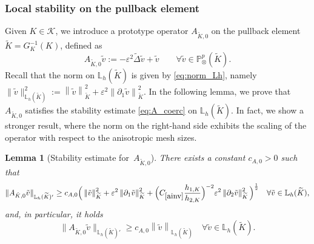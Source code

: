 \documentclass[a4paper,twoside,10pt]{article}
\newtheorem{lemma}[theorem]{Lemma}
\newcommand{\const}[1]{C_{\eqref{#1}}}
\newcommand{\AKO}{{A_{\tilde K,0}}}
\newcommand{\eps}{\varepsilon}
\newcommand*{\norm}[1]{\left\|#1\right\|}
\newcommand{\IL}{\mathbb{L}}
\newcommand{\IP}{\mathbb{P}}
\newcommand{\calK}{\mathcal{K}}
\numberwithin{equation}{section}
\newcommand{\Kt}{\widetilde{K}}
\newcommand{\hKot}{h_{1,K}}
\newcommand{\hKtt}{h_{2,K}}
\begin{document}
\subsubsection{Local stability on the pullback element}\label{sec:localstability_pullback}
Given $K\in\calK$, we introduce a prototype operator $\AKO$ on the pullback element $\Kt=G_K^{-1}(K)$, defined as
	\begin{equation}\label{eq:AK0}
	    \AKO  \tilde v := -\eps^2 
        \widetilde{\Delta}\tilde  v +   \tilde v \qquad 
        \forall \tilde v \in 
	    \IP^p_\otimes(\tilde K).
	\end{equation}
Recall that the norm on $\mathbb{L}_h(\Kt)$ is given by \eqref{eq:norm_Lh}, namely
$
\|\tilde v\|^2_{\mathbb{L}_h(\Kt)}
:= \norm{\tilde v}^2_{\Kt}
+\eps^2\norm{\partial_1\tilde v}^2_{\Kt}
$.
In the following lemma, we prove that $A_{\Kt,0}$ satisfies the stability estimate \eqref{eq:A_coerc} on $\IL_h(\Kt)$.
In fact, we show a stronger result, where the norm on the right-hand side exhibits the scaling of the operator with respect to the anisotropic mesh sizes.
	\begin{lemma}[Stability estimate for~$A_{\Kt, 0}$]\label{lem:localcoercivity}
		There exists a constant $c_{A,0}>0$ such that
	\begin{equation*}
		\|\AKO  \tilde v \|_{\IL_h(\Kt)'} 
	    \geq c_{A,0}
	    \Big( \norm{\tilde v}_{\Kt}^2 + \eps^2 \norm{\partial_1 \tilde v}_{\Kt}^2 + \Big(\const{ainv}\frac{\hKot}{\hKtt}\Big)^{-2} \eps^2 \norm{\partial_2 \tilde v}_{\Kt}^2 \Big)^{\frac{1}{2}}
	    \quad \forall \tilde v\in \IL_h(\Kt),
	\end{equation*}
    and, in particular,
    it holds 
	\begin{equation*}
		\|\AKO  \tilde v \|_{\IL_h(\Kt)'} 
        \geq c_{A,0} \norm{\tilde v}_{\mathbb{L}_h(\Kt)}
	    \quad \forall \tilde v\in \IL_h(\Kt).
	\end{equation*}
	\end{lemma}
\end{document}
